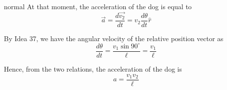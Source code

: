 \begin{solution}{normal}
At that moment, the acceleration of the dog is equal to
$$\vec{a} = \frac{d{\vec{v_2}}}{dt} = v_2\frac{ d\theta}{dt} \hat{r}$$

By Idea 37, we have the angular velocity of the relative position vector as 
$$\frac{d\theta}{dt} = \frac{v_1\sin{90^\circ}}{\ell} = \frac{v_1}{\ell}$$

Hence, from the two relations, the acceleration of the dog is
$$a = \boxed{\frac{v_1 v_2}{\ell}}$$
\end{solution}